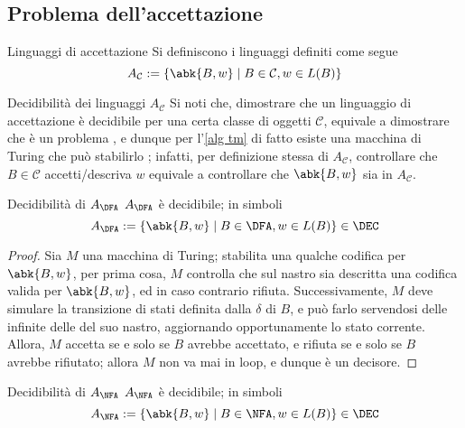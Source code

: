 \documentclass[a4paper, 12pt]{report}
\begin{document}
    \subsection{Problema dell'accettazione}

    \begin{frameddefn}{Linguaggi di accettazione}
        Si definiscono  i linguaggi definiti come segue $$A_\mathcal{C} := \{\abk{B, w} \mid B \in \mathcal{C} , w \in L(B)\}$$
    \end{frameddefn}

    \begin{framedobs}{Decidibilità dei linguaggi $A_\mathcal C$}
        Si noti che, dimostrare che un linguaggio di accettazione è decidibile per una certa classe di oggetti $\mathcal{C}$, equivale a dimostrare che  è un problema , e dunque per l'\cref{alg tm} di fatto esiste una macchina di Turing che può stabilirlo ; infatti, per definizione stessa di $A_\mathcal C$, controllare che $B \in \mathcal{C}$ accetti/descriva $w$ equivale a controllare che $\abk{B,w}$ sia in $A_\mathcal{C}$.
    \end{framedobs}

    \begin{framedthm}[label={a_dfa}]{Decidibilità di $A_\DFA$}
        $A_\DFA$ è decidibile; in simboli $$A_\DFA := \{\abk{B, w} \mid B \in \DFA, w \in L(B)\} \in \DEC$$
    \end{framedthm}

    \begin{proof}
        Sia $M$ una macchina di Turing; stabilita una qualche codifica per $\abk{B, w}$, per prima cosa, $M$ controlla che sul nastro sia descritta una codifica valida per $\abk{B,w}$, ed in caso contrario rifiuta. Successivamente, $M$ deve simulare la transizione di stati definita dalla $\delta$ di $B$, e può farlo servendosi delle infinite delle del suo nastro, aggiornando opportunamente lo stato corrente. Allora, $M$ accetta se e solo se $B$ avrebbe accettato, e rifiuta se e solo se $B$ avrebbe rifiutato; allora $M$ non va mai in loop, e dunque è un decisore.
    \end{proof}

    \begin{framedthm}[label={a_nfa}]{Decidibilità di $A_\NFA$}
        $A_\NFA$ è decidibile; in simboli $$A_\NFA := \{\abk{B, w} \mid B \in \NFA, w \in L(B)\} \in \DEC$$
    \end{framedthm}
\end{document}
